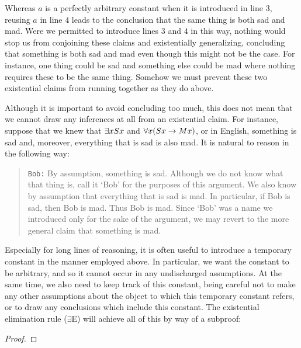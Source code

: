 Whereas $a$ is a perfectly arbitrary constant when it is introduced in line $3$, reusing $a$ in line $4$ leads to the conclusion that the same thing is both sad and mad.
Were we permitted to introduce lines $3$ and $4$ in this way, nothing would stop us from conjoining these claims and existentially generalizing, concluding that something is both sad and mad even though this might not be the case.
For instance, one thing could be sad and something else could be mad where nothing requires these to be the same thing. 
Somehow we must prevent these two existential claims from running together as they do above.

Although it is important to avoid concluding too much, this does not mean that we cannot draw any inferences at all from an existential claim.
For instance, suppose that we knew that $\exists x Sx$ and $\forall x(Sx \rightarrow Mx)$, or in English, something is sad and, moreover, everything that is sad is also mad.
It is natural to reason in the following way:

\begin{quote}
  \texttt{Bob:} By assumption, something is sad.
  Although we do not know what that thing is, call it `Bob' for the purposes of this argument.
  We also know by assumption that everything that is sad is mad.
  In particular, if Bob is sad, then Bob is mad.
  Thus Bob is mad.
  Since `Bob' was a name we introduced only for the sake of the argument, we may revert to the more general claim that something is mad.
\end{quote}

Especially for long lines of reasoning, it is often useful to introduce a temporary constant in the manner employed above.
In particular, we want the constant to be arbitrary, and so it cannot occur in any undischarged assumptions.
At the same time, we also need to keep track of this constant, being careful not to make any other assumptions about the object to which this temporary constant refers, or to draw any conclusions which include this constant.
The existential elimination rule ($\exists$E) will achieve all of this by way of a subproof:

\begin{proof}
	\open	
     
     
	\close
	 
\end{proof}


